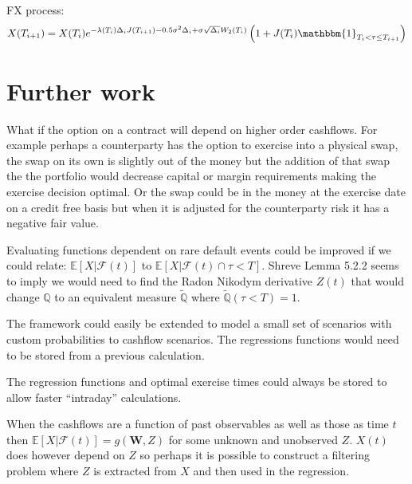 \documentclass[a4paper,10pt]{article}
\newcommand{\E}{\mathbb{E}}                 %
\newcommand{\Q}{\mathbb{Q}}                 %
\begin{document}
FX process:
\[X(T_{i+1}) = X(T_i) e ^ {-\lambda(T_i) \Delta_i J(T_{i+1}) -0.5 \sigma^2 \Delta_i + \sigma \sqrt{\Delta_i} W_2(T_i)} \left(1 + J(T_i) \mathbbm{1} _{T_i < \tau \leq T_{i+1}} \right)  \]

\section{Further work}
What if the option on a contract will depend on higher order cashflows.  For example perhaps a counterparty has the option to exercise into a physical swap, the swap on its own is slightly out of the money but the addition of that swap the the portfolio would decrease capital or margin requirements making the exercise decision optimal.  Or the swap could be in the money at the exercise date on a credit free basis but when it is adjusted for the counterparty risk it has a negative fair value.

Evaluating functions dependent on rare default events could be improved if we could relate: $\E[X|\mathcal{F}(t)]$ to $\E[X|\mathcal{F}(t)\cap \tau<T]$.  Shreve \cite{Shreve} Lemma 5.2.2 seems to imply we would need to find the Radon Nikodym derivative $Z(t)$ that would change $\Q$ to an equivalent measure $\tilde{\Q}$ where $\tilde{\Q}(\tau<T)=1$.

The framework could easily be extended to model a small set of scenarios with custom probabilities to cashflow scenarios.  The regressions functions would need to be stored from a previous calculation.

The regression functions and optimal exercise times could always be stored to allow faster ``intraday'' calculations.

When the cashflows are a function of past observables as well as those as time $t$ then $\E[X|\mathcal{F}(t)] = g(\textbf{W}, Z)$ for some unknown and unobserved $Z$. $X(t)$ does however depend on $Z$ so perhaps it is possible to construct a filtering problem where $Z$ is extracted from $X$ and then used in the regression.




\end{document}
